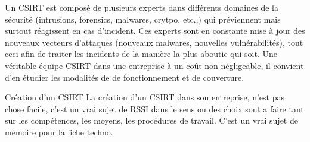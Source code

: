 Un CSIRT est composé de plusieurs experts dans différents domaines de la sécurité (intrusions, forensics, malwares, crytpo, etc..) qui préviennent mais surtout réagissent en cas d’incident. Ces experts sont en constante mise à jour des nouveaux vecteurs d’attaques (nouveaux malwares, nouvelles vulnérabilités), tout ceci afin de traiter les incidents de la manière la plus aboutie qui soit. Une véritable équipe CSIRT dans une entreprise à un coût non négligeable, il convient d'en étudier les modalités de de fonctionnement et de couverture.


\begin{notebox}{Création d'un CSIRT}
La création d'un CSIRT dans son entreprise, n'est pas chose facile, c'est un vrai sujet de RSSI dans le sens ou des choix sont a faire tant sur les compétences, les moyens, les procédures de travail. C'est un vrai sujet de mémoire pour la fiche techno.
\end{notebox}
